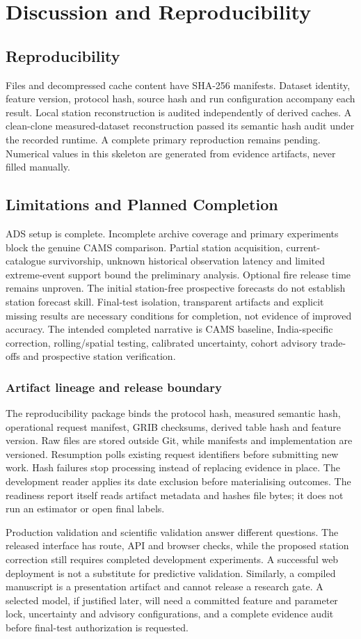 \section{Discussion and Reproducibility}
\subsection{Reproducibility}
Files and decompressed cache content have SHA-256 manifests. Dataset identity,
feature version, protocol hash, source hash and run configuration accompany each
result. Local station reconstruction is audited independently of derived caches.
A clean-clone measured-dataset reconstruction passed its semantic hash audit under the recorded runtime. A complete primary reproduction remains pending. Numerical values
in this skeleton are generated from evidence artifacts, never filled manually.


\subsection{Limitations and Planned Completion}
ADS setup is complete. Incomplete archive coverage and primary experiments block the genuine CAMS comparison. Partial station acquisition, current-catalogue survivorship,
unknown historical observation latency and limited extreme-event support bound
the preliminary analysis. Optional fire release time remains unproven. The
initial station-free prospective forecasts do not establish station forecast
skill. Final-test isolation, transparent artifacts and explicit missing results
are necessary conditions for completion, not evidence of improved accuracy.
The intended completed narrative is CAMS baseline, India-specific correction,
rolling/spatial testing, calibrated uncertainty, cohort advisory trade-offs and
prospective station verification.


\subsubsection{Artifact lineage and release boundary}
The reproducibility package binds the protocol hash, measured semantic hash,
operational request manifest, GRIB checksums, derived table hash and feature
version. Raw files are stored outside Git, while manifests and implementation
are versioned. Resumption polls existing request identifiers before submitting
new work. Hash failures stop processing instead of replacing evidence in place.
The development reader applies its date exclusion before materialising
outcomes. The readiness report itself reads artifact metadata and hashes file
bytes; it does not run an estimator or open final labels.

Production validation and scientific validation answer different questions.
The released interface has route, API and browser checks, while the proposed
station correction still requires completed development experiments. A
successful web deployment is not a substitute for predictive validation.
Similarly, a compiled manuscript is a presentation artifact and cannot
release a research gate. A selected model, if justified later, will need a
committed feature and parameter lock, uncertainty and advisory configurations,
and a complete evidence audit before final-test authorization is requested.
